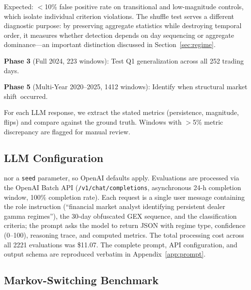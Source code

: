 \documentclass[jrfm,article,accept,moreauthors,pdftex]{Definitions/mdpi}
\begin{document}
{Expected:} %
 $<$10\% false positive rate on transitional and low-magnitude controls, which isolate individual criterion violations. The shuffle test serves a different diagnostic purpose: by preserving aggregate statistics while destroying temporal order, it measures whether detection depends on day sequencing or aggregate dominance---an important distinction discussed in Section~\ref{sec:regime}.

\textbf{Phase 3} (Full 2024, 223 windows): Test Q1 generalization across all 252 trading days.


\textbf{Phase 5} (Multi-Year 2020--2025, 1412 windows): Identify when structural market \mbox{shift occurred.}

For each LLM response, we extract the stated metrics (persistence, magnitude, flips) and compare against the ground truth. Windows with $>$5\% metric discrepancy are flagged for manual review.

\subsection{LLM Configuration}

 nor a \texttt{seed} parameter, so OpenAI defaults apply. Evaluations are processed via the OpenAI Batch API (\texttt{/v1/chat/completions}, asynchronous 24-h completion window, 100\% completion rate). Each request is a single user message containing the role instruction (``financial market analyst identifying persistent dealer gamma regimes''), the 30-day obfuscated GEX sequence, and the classification criteria; the prompt asks the model to return JSON with regime type, confidence (0--100), reasoning trace, and computed metrics. The total processing cost across all 2221 evaluations was \$11.07. The complete prompt, API configuration, and output schema are reproduced verbatim in Appendix~\ref{app:prompt}.

\subsection{Markov-Switching Benchmark}
\label{sec:methodology:benchmark}
\end{document}
